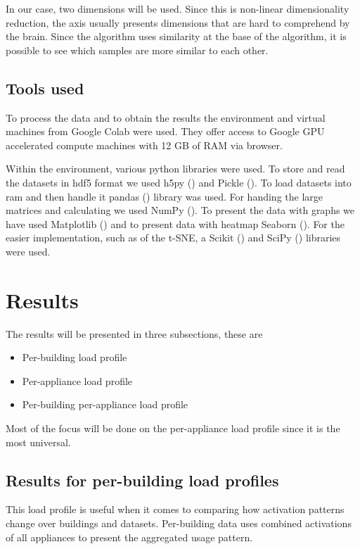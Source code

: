 In our case, two dimensions will be used. Since this is non-linear dimensionality reduction,
the axis usually presents dimensions that are hard to comprehend by the brain. 
Since the algorithm uses similarity at the base of the algorithm, it is possible to 
see which samples are more similar to each other.

\subsection{Tools used}

To process the data and to obtain the results the environment and virtual machines from Google Colab \cite{colab} were used.
They offer access to Google GPU accelerated compute machines with 12 GB of RAM via browser. 

Within the environment, various python libraries were used.
To store and read the datasets in hdf5 format we used h5py  (\cite{hdf5}) and Pickle  (\cite{pickle}).
To load datasets into ram and then handle it pandas  (\cite{pandas}) library was used.
For handing the large matrices and calculating we used NumPy  (\cite{numpy}).
To present the data with graphs we have used Matplotlib  (\cite{matplotlib}) and to present data with heatmap Seaborn  (\cite{seaborn}).
For the easier implementation, such as of the t-SNE, a Scikit  (\cite{scikit}) and SciPy  (\cite{scipy}) libraries were used.

\section{Results}

The results will be presented in three subsections, these are

\begin{itemize}
	\item Per-building load profile
	\item Per-appliance load profile
	\item Per-building per-appliance load profile
\end{itemize}

Most of the focus will be done on the per-appliance load profile since it is the most universal.

\subsection{Results for per-building load profiles}
\label{ssec:res_pb_lp}
This load profile is useful when it comes to comparing how 
activation patterns change over buildings and datasets.
Per-building data uses combined activations of all appliances to present 
the aggregated usage pattern. 

